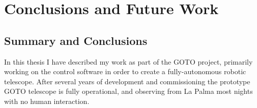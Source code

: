 
\chapter{Conclusions and Future Work}
\label{chap:conclusion}


\chaptoc{}


\section{Summary and Conclusions}
\label{sec:conclusion}


\begin{colsection}

In this thesis I have described my work as part of the GOTO project, primarily working on the control software in order to create a fully-autonomous robotic telescope. After several years of development and commissioning the prototype GOTO telescope is fully operational, and observing from La Palma most nights with no human interaction.

\end{colsection}


